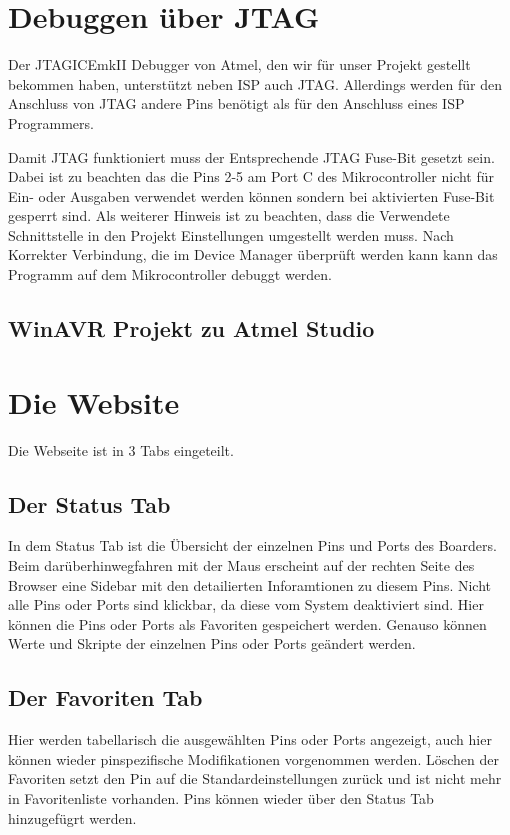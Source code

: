 \section{Debuggen über JTAG}

Der JTAGICEmkII Debugger von Atmel, den wir für unser Projekt gestellt bekommen
haben, unterstützt neben ISP auch JTAG. Allerdings werden für den Anschluss von
JTAG andere Pins benötigt als für den Anschluss eines ISP Programmers.



Damit \ac{JTAG} funktioniert muss der Entsprechende JTAG Fuse-Bit gesetzt sein.
Dabei ist zu beachten das die Pins 2-5 am Port C des Mikrocontroller nicht für
Ein- oder Ausgaben verwendet werden können sondern bei aktivierten Fuse-Bit
gesperrt sind. Als weiterer Hinweis ist zu beachten, dass die Verwendete
Schnittstelle in den Projekt Einstellungen umgestellt werden muss. Nach
Korrekter Verbindung, die im Device Manager überprüft werden kann kann das
Programm auf dem Mikrocontroller debuggt werden.

\subsection{WinAVR Projekt zu Atmel Studio}


\section{Die Website}

Die Webseite ist in 3 Tabs eingeteilt. 

\subsection{Der Status Tab}
In dem Status Tab ist die Übersicht der
einzelnen Pins und Ports des Boarders. Beim darüberhinwegfahren mit der
Maus erscheint auf der rechten Seite des Browser eine Sidebar mit den
detailierten Inforamtionen zu diesem Pins. Nicht alle Pins oder Ports sind
klickbar, da diese vom System deaktiviert sind. Hier können die Pins oder Ports
als Favoriten gespeichert werden. Genauso können Werte und Skripte der einzelnen
Pins oder Ports geändert werden.

\subsection{Der Favoriten Tab}
Hier werden tabellarisch die ausgewählten Pins oder Ports angezeigt, auch hier
können wieder pinspezifische Modifikationen vorgenommen werden. Löschen der
Favoriten setzt den Pin auf die Standardeinstellungen zurück und ist nicht mehr
in Favoritenliste vorhanden. Pins können wieder über den Status Tab hinzugefügrt
werden.

